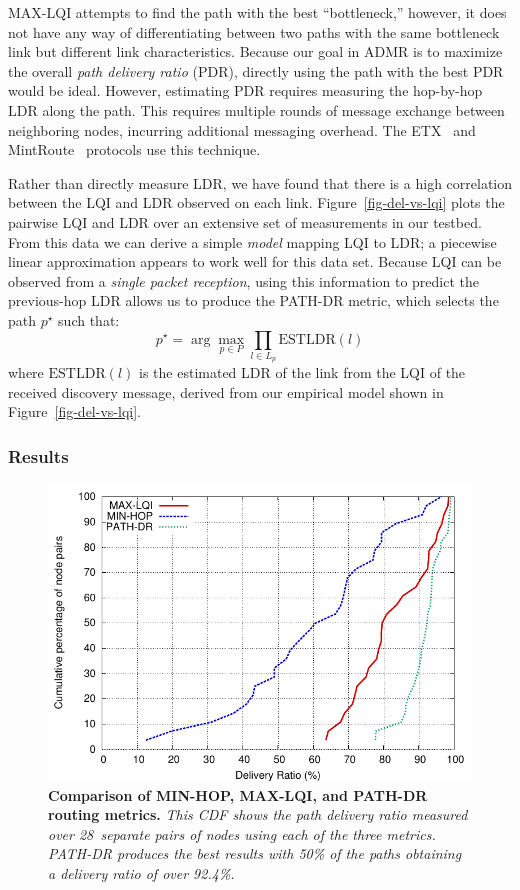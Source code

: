 MAX-LQI attempts to find the path with the best ``bottleneck,''
however, it does not have any way of differentiating between
two paths with the same bottleneck link but different 
link characteristics. Because our goal in ADMR is to maximize
the overall {\em path delivery ratio} (PDR), directly
using the path with the best PDR would be ideal. However, estimating PDR
requires measuring the hop-by-hop LDR along the path.
This requires multiple rounds of message exchange between
neighboring nodes, incurring additional messaging overhead.
The ETX~\cite{etx} and MintRoute~\cite{awoo-multihop} protocols
use this technique.

Rather than directly measure LDR, we have found that there is a 
high correlation between the LQI and LDR observed on each link.
Figure~\ref{fig-del-vs-lqi} plots the pairwise LQI and LDR over an
extensive set of measurements in our testbed. 
From this data we can derive a simple {\em model} mapping
LQI to LDR; a piecewise linear approximation appears to work well
for this data set. Because LQI can be observed from a {\em single
packet reception}, using this information to predict the previous-hop
LDR allows us to produce the PATH-DR metric, which selects the
path $p^\star$ such that:
\[
  p^\star = \arg \max_{p \in P} \prod_{l \in L_p} \mathrm{ESTLDR}(l)
\]
where $\mathrm{ESTLDR}(l)$ is the estimated LDR of the link from
the LQI of the received discovery message, derived from our empirical
model shown in Figure~\ref{fig-del-vs-lqi}.

\subsubsection{Results}

\begin{figure}[t]
\begin{center}
\includegraphics[width=0.6\hsize]{resources/tinyadmr-techrept05/figures/lessons/lqivshop/lqi-hop-pathdr-cdf.pdf}
\end{center}
\caption{{\small {\bf Comparison of MIN-HOP, MAX-LQI, and PATH-DR
routing metrics.} {\em This CDF shows the path delivery ratio measured
over 28~separate pairs of nodes using each of the three metrics.
PATH-DR produces the best results with 50\% of the paths obtaining a
delivery ratio of over 92.4\%.}}}
\label{fig-lqi-hop-pathdr}
\end{figure}

